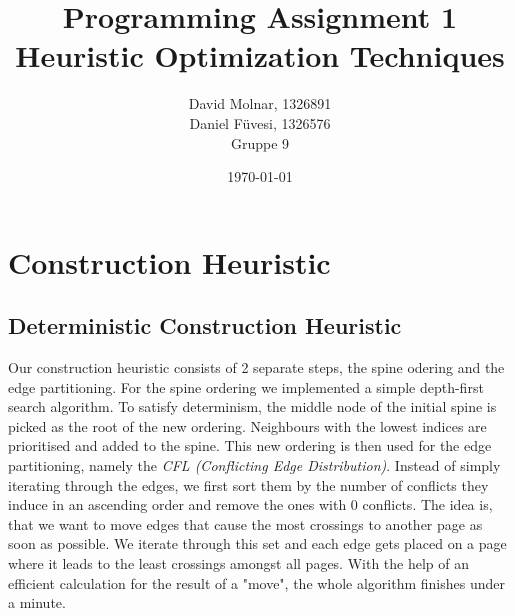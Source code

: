 \documentclass[11pt]{article}
\title{Programming Assignment 1\\ \vspace{10px} \large Heuristic Optimization Techniques}
\author{David Molnar, 1326891\\ Daniel Füvesi, 1326576\\Gruppe 9}
\date{\today}
\begin{document}
\lstset{language=Java}
\maketitle
 
\section{Construction Heuristic}
\subsection{Deterministic Construction Heuristic}

\hspace{0.5cm} Our construction heuristic consists of 2 separate steps, the spine odering and the edge partitioning. For the spine ordering we implemented a simple depth-first search algorithm. To satisfy determinism, the middle node of the initial spine is picked as the root of the new ordering. Neighbours with the lowest indices are prioritised and added to the spine. This new ordering is then used for the edge partitioning, namely the \textit{CFL (Conflicting Edge Distribution)}. Instead of simply iterating through the edges, we first sort them by the number of conflicts they induce in an ascending order and remove the ones with 0 conflicts. The idea is, that we want to move edges that cause the most crossings to another page as soon as possible. We iterate through this set and each edge gets placed on a page where it leads to the least crossings amongst all pages. With the help of an efficient calculation for the result of a "move", the whole algorithm finishes under a minute.\\
\newline
\end{document}
